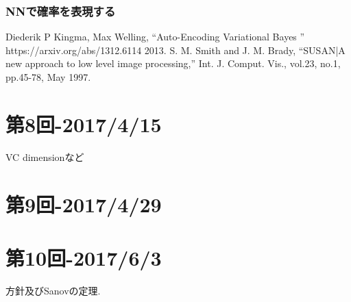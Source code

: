 \documentclass{ujarticle}
\begin{document}
\section{NNで確率を表現する}
\label{sec:NNで確率を表現する}



\begin{thebibliography}{9}
   Diederik P Kingma, Max Welling,
    ``Auto-Encoding Variational Bayes '' https://arxiv.org/abs/1312.6114 2013.
   S. M. Smith and J. M. Brady,
    ``SUSAN|A new approach to low level image processing,'' Int. J. Comput.
    Vis., vol.23, no.1, pp.45-78, May 1997.
\end{thebibliography}

\part{第8回-2017/4/15}
VC dimensionなど

\part{第9回-2017/4/29}

\part{第10回-2017/6/3}
方針及びSanovの定理.
\end{document}
